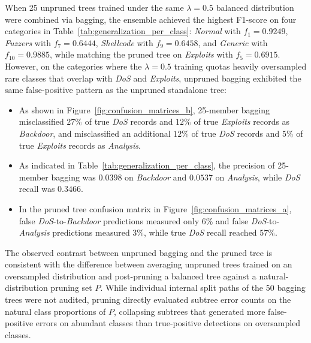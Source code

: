 When 25 unpruned trees trained under the same $\lambda = 0.5$ balanced distribution were combined via bagging, the ensemble achieved the highest F1-score on four categories in Table~\ref{tab:generalization_per_class}: \emph{Normal} with $f_1 = 0.9249$, \emph{Fuzzers} with $f_7 = 0.6444$, \emph{Shellcode} with $f_9 = 0.6458$, and \emph{Generic} with $f_{10} = 0.9885$, while matching the pruned tree on \emph{Exploits} with $f_5 = 0.6915$. However, on the categories where the $\lambda = 0.5$ training quotas heavily oversampled rare classes that overlap with \emph{DoS} and \emph{Exploits}, unpruned bagging exhibited the same false-positive pattern as the unpruned standalone tree:
\begin{itemize}
    \item As shown in Figure~\ref{fig:confusion_matrices_b}, 25-member bagging misclassified $27\%$ of true \emph{DoS} records and $12\%$ of true \emph{Exploits} records as \emph{Backdoor}, and misclassified an additional $12\%$ of true \emph{DoS} records and $5\%$ of true \emph{Exploits} records as \emph{Analysis}.
    \item As indicated in Table~\ref{tab:generalization_per_class}, the precision of 25-member bagging was $0.0398$ on \emph{Backdoor} and $0.0537$ on \emph{Analysis}, while \emph{DoS} recall was $0.3466$.
    \item In the pruned tree confusion matrix in Figure~\ref{fig:confusion_matrices_a}, false \emph{DoS}-to-\emph{Backdoor} predictions measured only $6\%$ and false \emph{DoS}-to-\emph{Analysis} predictions measured $3\%$, while true \emph{DoS} recall reached $57\%$.
\end{itemize}
The observed contrast between unpruned bagging and the pruned tree is consistent with the difference between averaging unpruned trees trained on an oversampled distribution and post-pruning a balanced tree against a natural-distribution pruning set $P$. While individual internal split paths of the 50 bagging trees were not audited, pruning directly evaluated subtree error counts on the natural class proportions of $P$, collapsing subtrees that generated more false-positive errors on abundant classes than true-positive detections on oversampled classes.

